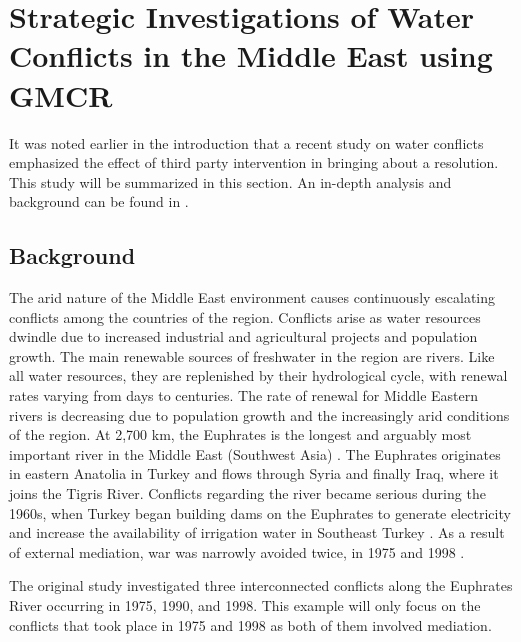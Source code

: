 \documentclass[letterpaper,12pt,titlepage,oneside,final]{book}
\begin{document}

\chapter{Strategic Investigations of Water Conflicts in the Middle East using GMCR}
\label{sec:example1}
It was noted earlier in the introduction that a recent study on water conflicts emphasized the effect of third party intervention in bringing about a resolution. This study will be summarized in this section. An in-depth analysis and background can be found in \citet{HipelRami}.

\section{Background}
The arid nature of the Middle East environment causes continuously escalating conflicts among the countries of the region. Conflicts arise as water resources dwindle due to increased industrial and agricultural projects and population growth. The main renewable sources of freshwater in the region are rivers. Like all water resources, they are replenished by their hydrological cycle, with renewal rates varying from days to centuries. The rate of renewal for Middle Eastern rivers is decreasing due to population growth and the increasingly arid conditions of the region. At 2,700 km, the Euphrates is the longest and arguably most important river in the Middle East (Southwest Asia) \citep{kolars1991euphrates}.
The Euphrates originates in eastern Anatolia in Turkey and flows through Syria and finally Iraq, where it joins the Tigris River. Conflicts regarding the river became serious during the 1960s, when Turkey began building dams on the Euphrates to generate electricity and increase the availability of irrigation water in Southeast Turkey \citep{akanda2007tigris}. As a result of external mediation, war was narrowly avoided twice, in 1975 and 1998 \citep{akanda2007tigris}.

The original study investigated three interconnected conflicts along the Euphrates River occurring in 1975, 1990, and 1998. This example will only focus on the conflicts that took place in 1975 and 1998 as both of them involved mediation. 
\end{document}
